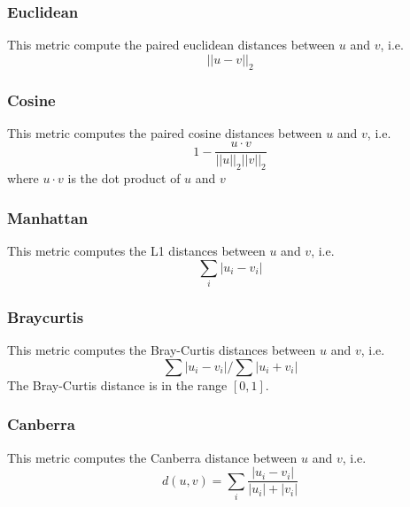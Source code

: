 \subsubsection{Euclidean}
This metric compute the paired euclidean distances between $u$ and $v$, i.e.
\begin{equation}
  {||u-v||}_2
\end{equation}


\subsubsection{Cosine}
This metric computes the paired cosine distances between $u$ and $v$, i.e.
\begin{equation}
  1 - \frac{u \cdot v}{||u||_2 ||v||_2}
\end{equation}
where $u \cdot v$ is the dot product of $u$ and $v$


\subsubsection{Manhattan}
This metric computes the L1 distances between $u$ and $v$, i.e.
\begin{equation}
  \sum_i {\left| u_i - v_i \right|}
\end{equation}


\subsubsection{Braycurtis}
This metric computes the Bray-Curtis distances between $u$ and $v$, i.e.
\begin{equation}
  \sum{|u_i-v_i|} / \sum{|u_i+v_i|}
\end{equation}
The Bray-Curtis distance is in the range $[0, 1]$.

\subsubsection{Canberra}
This metric computes the Canberra distance between $u$ and $v$, i.e.
\begin{equation}
  d(u,v) = \sum_i \frac{|u_i-v_i|}{|u_i|+|v_i|}
\end{equation}

